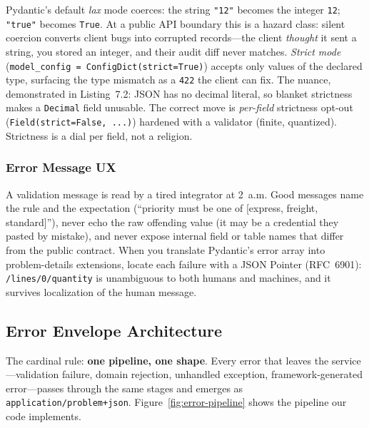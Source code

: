 Pydantic's default \emph{lax} mode coerces: the string \texttt{"12"} becomes
the integer \texttt{12}; \texttt{"true"} becomes \texttt{True}. At a public
API boundary this is a hazard class: silent coercion converts client bugs
into corrupted records---the client \emph{thought} it sent a string, you
stored an integer, and their audit diff never matches. \emph{Strict mode}
(\texttt{model\_config = ConfigDict(strict=True)}) accepts only values of
the declared type, surfacing the type mismatch as a \texttt{422} the client
can fix. The nuance, demonstrated in Listing~7.2: JSON has no decimal
literal, so blanket strictness makes a \texttt{Decimal} field unusable. The
correct move is \emph{per-field} strictness opt-out
(\texttt{Field(strict=False, ...)}) hardened with a validator (finite,
quantized). Strictness is a dial per field, not a religion.

\subsubsection{Error Message UX}

A validation message is read by a tired integrator at 2~a.m. Good messages
name the rule and the expectation (``priority must be one of [express,
freight, standard]''), never echo the raw offending value (it may be a
credential they pasted by mistake), and never expose internal field or table
names that differ from the public contract. When you translate Pydantic's
error array into problem-details extensions, locate each failure with a JSON
Pointer (RFC~6901): \texttt{/lines/0/quantity} is unambiguous to both humans
and machines, and it survives localization of the human message.

\subsection{Error Envelope Architecture}

The cardinal rule: \textbf{one pipeline, one shape}. Every error that leaves
the service---validation failure, domain rejection, unhandled exception,
framework-generated error---passes through the same stages and emerges as
\texttt{application/problem+json}. Figure~\ref{fig:error-pipeline} shows the
pipeline our code implements.

